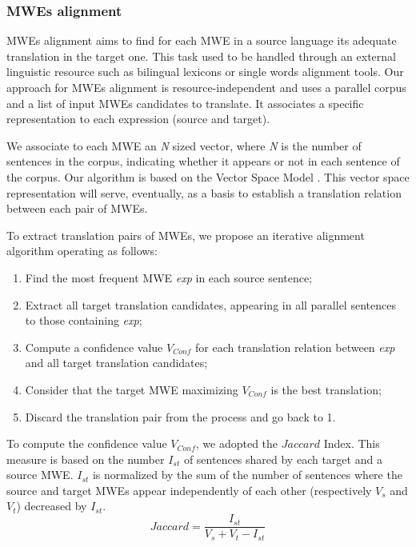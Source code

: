 \documentclass[output=paper,modfonts,nonflat]{langsci/langscibook}
\begin{document}
\subsubsection{MWEs alignment}
MWEs alignment aims to find for each MWE in a source language its adequate translation in the target one. 
This task used to be handled through an external linguistic resource such as bilingual lexicons or single words alignment tools. Our approach for MWEs alignment is resource-independent and uses a parallel corpus and a list of input MWEs candidates to translate. It associates a specific representation to each expression (source and target). 

We associate to each MWE an \textit{N} sized vector, where \textit{N} is the number of sentences in the corpus, indicating whether it appears or not in each sentence of the corpus. 
Our algorithm is based on the Vector Space Model \citep{salton1975vector}.
This vector space representation will serve, eventually, as a basis to establish a translation relation between each pair of MWEs. 
 
To extract translation pairs of MWEs, we propose an iterative alignment algorithm operating as follows:
\begin{enumerate}
\item Find the most frequent MWE \textit{exp} in each source sentence;
\item Extract all target translation candidates, appearing in all parallel sentences to those containing \textit{exp};
\item Compute a confidence value $V_{Conf}$ for each translation relation between \textit{exp} and all target translation candidates;
\item Consider that the target MWE maximizing $V_{Conf}$ is the best translation;
\item Discard the translation pair from the process and go back to 1.
\end{enumerate}

To compute the confidence value $V_{Conf}$, we adopted the $Jaccard$ Index. %
This measure is based on the number $I_{st}$ of sentences shared by each target and a source MWE. 
$I_{st}$ is normalized by the sum of the number of sentences where the source and target MWEs appear independently of each other (respectively $V_s$ and $V_t$) decreased by $I_{st}$. 
 \begin{equation}
 \label{jaccard}
  Jaccard=\frac{I_{st}}{V_s+V_t-I_{st}}
 \end{equation}
\end{document}
